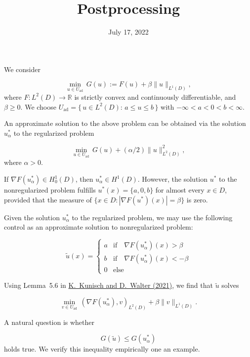 \documentclass{scrartcl}
\title{Postprocessing}
\date{July 17, 2022}
\newcommand{\norm}[2][2]{\|#2\|_{#1}}
\newcommand{\adcsp}{U_{\text{ad}}}
\newcommand{\domain}{D}
\newcommand{\real}{\mathbb{R}}
\begin{document}
\maketitle

We consider 

$$
	\min_{u \in \adcsp}\, 
	G(u) := F(u) + \beta \norm[L^1(\domain)]{u},
$$
where $F : L^2(\domain) \to \real$ is strictly convex and continuously
differentiable, and $\beta \geq 0$. 
We choose $\adcsp = \{\, u \in L^2(\domain) :\, a \leq u \leq b\,\}$
with $-\infty < a  < 0 < b < \infty$.

An approximate solution to the above problem can be obtained via the solution
$u_\alpha^*$
to the regularized problem

$$
\min_{u \in \adcsp}\, 
G(u) + (\alpha/2)\norm[L^2(\domain)]{u}^2,
$$
where $\alpha > 0$.

If $\nabla F(u_\alpha^*) \in H_0^1(\domain)$, then
$u_\alpha^* \in H^1(\domain)$. 
However, the solution $u^*$  to the nonregularized problem fulfills
$u^*(x) = \{a, 0, b\}$ for almost every $x \in \domain$, provided
that the measure of $\{x \in \domain : |\nabla F(u^*)(x)| = \beta\}$ is zero.

Given the solution $u_\alpha^*$
to the regularized problem, we may use the following control
as an approximate solution to  nonregularized problem:

$$
	\widetilde{u}(x) = 
	\begin{cases}
	a & \text{if} \quad \nabla F(u_\alpha^*)(x) > \beta \\
	b & \text{if} \quad \nabla F(u_\alpha^*)(x) < -\beta \\
	0 & \text{else}
	\end{cases}
$$

Using Lemma~5.6 in 
\href{https://arxiv.org/abs/2109.15217}{K.\ Kunisch and D.\ Walter (2021)}, we find that
$\widetilde{u}$ solves

$$
	\min_{v \in \adcsp}\, 
	(\nabla F(u_\alpha^*),v)_{L^2(\domain)}
	+\beta \norm[L^1(\domain)]{v}.
$$

A natural question is whether

$$
	G(\widetilde{u}) \leq G(u_\alpha^*)
$$
holds true. We verify this inequality empirically one an example.
\end{document}
